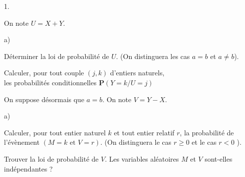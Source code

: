 \documentclass[11pt]{article}%
\begin{document}
\begin{noliste}{1.}
\item On note $U = X + Y.$

\begin{noliste}{a)}
 \setlength{\itemsep}{2mm}
\item Déterminer la loi de probabilité de $U$. (On distinguera les cas
$a = b$
et $a\ne b$).

\item Calculer, pour tout couple $(j,k)$ d'entiers naturels, \\
les probabilités conditionnelles $\mathbf{P}\left( Y = k/U = j\right) $
\end{noliste}

\item On suppose désormais que $a = b$. On note $V = Y-X$.

\begin{noliste}{a)}
 \setlength{\itemsep}{2mm}
\item Calculer, pour tout entier naturel $k$ et tout entier relatif
$r$, la
probabilité de l'évènement $\left( M = k\text{ et }V = r\right) $. (On
distinguera le cas $r\geq 0$ et le cas $r<0$ ).

\item Trouver la loi de probabilité de $V$. Les variables aléatoires
$M$ et $V$ sont-elles indépendantes ?
\end{noliste}
\end{noliste}

\label{fin}
\end{document}
